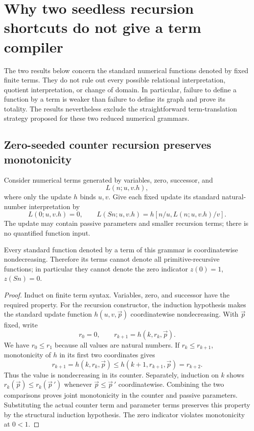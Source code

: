 
\section{Why two seedless recursion shortcuts do not give a term compiler}
\label{seedless:section}

The two results below concern the standard numerical functions denoted
by fixed finite terms. They do not rule out every possible relational
interpretation, quotient interpretation, or change of domain. In
particular, failure to define a function by a term is weaker than failure
to define its graph and prove its totality. The results nevertheless
exclude the straightforward term-translation strategy proposed for
these two reduced numerical grammars.

\subsection{Zero-seeded counter recursion preserves monotonicity}

Consider numerical terms generated by variables, zero, successor, and
\[
                  L(n;u,v.h),
\]
where only the update $h$ binds $u,v$. Give each fixed update its standard
natural-number interpretation by
\[
 L(0;u,v.h)=0,\qquad
 L(Sn;u,v.h)=h[n/u,L(n;u,v.h)/v].
 \tag{Zero-seeded recursion}
\]
The update may contain passive parameters and smaller recursion terms;
there is no quantified function input.

\begin{proposition}
\label{seedless:monotonicity}
Every standard function denoted by a term of this grammar is
coordinatewise nondecreasing. Therefore its terms cannot denote all
primitive-recursive functions; in particular they cannot denote the
zero indicator $z(0)=1$, $z(Sn)=0$.
\end{proposition}
\begin{proof}
Induct on finite term syntax. Variables, zero, and successor have the
required property. For the recursion constructor, the induction hypothesis
makes the standard update function $h(u,v,\vec p)$ coordinatewise
nondecreasing. With $\vec p$ fixed, write
\[
 r_0=0,\qquad r_{k+1}=h(k,r_k,\vec p).
\]
We have $r_0\le r_1$ because all values are natural numbers. If
$r_k\le r_{k+1}$, monotonicity of $h$ in its first two coordinates gives
\[
 r_{k+1}=h(k,r_k,\vec p)
 \le h(k+1,r_{k+1},\vec p)=r_{k+2}.
\]
Thus the value is nondecreasing in its counter. Separately, induction on
$k$ shows $r_k(\vec p)\le r_k(\vec p\,')$ whenever
$\vec p\le\vec p\,'$ coordinatewise. Combining the two comparisons
proves joint monotonicity in the counter and passive parameters.
Substituting the actual counter term and parameter terms preserves this
property by the structural induction hypothesis. The zero indicator
violates monotonicity at $0<1$.
\end{proof}

